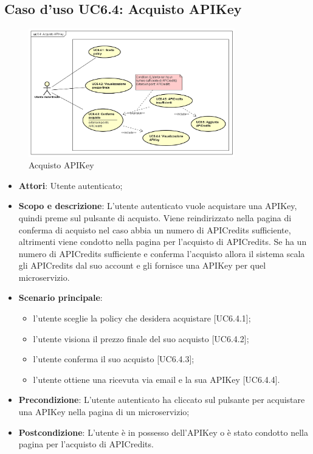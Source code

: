 \documentclass[12pt,a4paper,titlepage]{article}
\begin{document}
	\subsection{Caso d'uso UC6.4: Acquisto APIKey}
	\label{UC6.4}
	\begin{figure}[H]
		\centering
		\includegraphics[width=0.8\textwidth]{UseCase/AcquistoAPIKey}
		\caption{Acquisto APIKey}
	\end{figure}
	\begin{itemize}
		\item \textbf{Attori}: Utente autenticato;
		\item \textbf{Scopo e descrizione}: L'utente autenticato vuole acquistare una APIKey, quindi preme sul pulsante di acquisto. Viene reindirizzato nella pagina di conferma di acquisto nel caso abbia un numero di APICredits sufficiente, altrimenti viene condotto nella pagina per l'acquisto di APICredits. Se ha un numero di APICredits sufficiente e conferma l'acquisto allora il sistema scala gli APICredits dal suo account e gli fornisce una APIKey per quel microservizio.
		\item \textbf{Scenario principale}:
			\begin{itemize}
				\item l'utente sceglie la policy che desidera acquistare [UC6.4.1];
				\item l'utente visiona il prezzo finale del suo acquisto [UC6.4.2];
				\item l'utente conferma il suo acquisto [UC6.4.3];
				\item l'utente ottiene una ricevuta via email e la sua APIKey [UC6.4.4].
			\end{itemize}
		\item \textbf{Precondizione}: L'utente autenticato ha cliccato sul pulsante per acquistare una APIKey nella pagina di un microservizio;
		\item \textbf{Postcondizione}: L'utente è in possesso dell'APIKey o è stato condotto nella pagina per l'acquisto di APICredits.
	\end{itemize}
\end{document}
